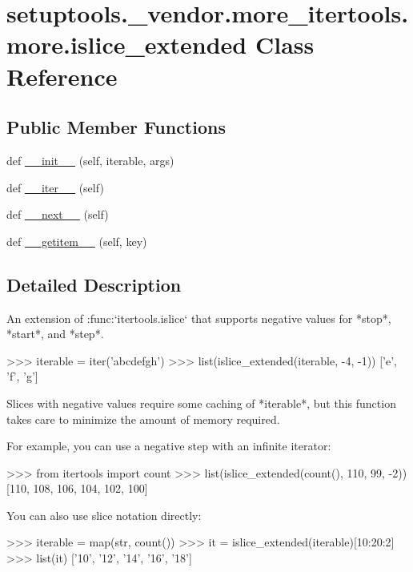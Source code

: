 \hypertarget{classsetuptools_1_1__vendor_1_1more__itertools_1_1more_1_1islice__extended}{}\section{setuptools.\+\_\+vendor.\+more\+\_\+itertools.\+more.\+islice\+\_\+extended Class Reference}
\label{classsetuptools_1_1__vendor_1_1more__itertools_1_1more_1_1islice__extended}
\subsection*{Public Member Functions}
\begin{DoxyCompactItemize}
\item 
def \hyperlink{classsetuptools_1_1__vendor_1_1more__itertools_1_1more_1_1islice__extended_a226ac7be84a14b75d0ffcb7b39a4dae4}{\+\_\+\+\_\+init\+\_\+\+\_\+} (self, iterable, args)
\item 
def \hyperlink{classsetuptools_1_1__vendor_1_1more__itertools_1_1more_1_1islice__extended_aea1e2c0e26f14f7dfc6b806d99002ee4}{\+\_\+\+\_\+iter\+\_\+\+\_\+} (self)
\item 
def \hyperlink{classsetuptools_1_1__vendor_1_1more__itertools_1_1more_1_1islice__extended_a3e2aab9dd44013cbe5903ef97b455c26}{\+\_\+\+\_\+next\+\_\+\+\_\+} (self)
\item 
def \hyperlink{classsetuptools_1_1__vendor_1_1more__itertools_1_1more_1_1islice__extended_af4aae326b398dd50b10439c5dd40d8fc}{\+\_\+\+\_\+getitem\+\_\+\+\_\+} (self, key)
\end{DoxyCompactItemize}


\subsection{Detailed Description}
\begin{DoxyVerb}An extension of :func:`itertools.islice` that supports negative values
for *stop*, *start*, and *step*.

    >>> iterable = iter('abcdefgh')
    >>> list(islice_extended(iterable, -4, -1))
    ['e', 'f', 'g']

Slices with negative values require some caching of *iterable*, but this
function takes care to minimize the amount of memory required.

For example, you can use a negative step with an infinite iterator:

    >>> from itertools import count
    >>> list(islice_extended(count(), 110, 99, -2))
    [110, 108, 106, 104, 102, 100]

You can also use slice notation directly:

    >>> iterable = map(str, count())
    >>> it = islice_extended(iterable)[10:20:2]
    >>> list(it)
    ['10', '12', '14', '16', '18']\end{DoxyVerb}
 

